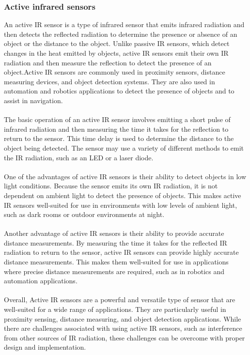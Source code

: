 \documentclass[12pt]{article}
\begin{document}
\subsubsection{Active infrared sensors}
An active IR sensor is a type of infrared sensor that emits infrared radiation and then detects the reflected radiation to determine the presence or absence of an object or the distance to the object. Unlike passive IR sensors, which detect changes in the heat emitted by objects, active IR sensors emit their own IR radiation and then measure the reflection to detect the presence of an object.Active IR sensors are commonly used in proximity sensors, distance measuring devices, and object detection systems. They are also used in automation and robotics applications to detect the presence of objects and to assist in navigation.
\\
\\
The basic operation of an active IR sensor involves emitting a short pulse of infrared radiation and then measuring the time it takes for the reflection to return to the sensor. This time delay is used to determine the distance to the object being detected. The sensor may use a variety of different methods to emit the IR radiation, such as an LED or a laser diode.
\\
\\
One of the advantages of active IR sensors is their ability to detect objects in low light conditions. Because the sensor emits its own IR radiation, it is not dependent on ambient light to detect the presence of objects. This makes active IR sensors well-suited for use in environments with low levels of ambient light, such as dark rooms or outdoor environments at night.
\\
\\
Another advantage of active IR sensors is their ability to provide accurate distance measurements. By measuring the time it takes for the reflected IR radiation to return to the sensor, active IR sensors can provide highly accurate distance measurements. This makes them well-suited for use in applications where precise distance measurements are required, such as in robotics and automation applications.
\\
\\
Overall, Active IR sensors are a powerful and versatile type of sensor that are well-suited for a wide range of applications. They are particularly useful in proximity sensing, distance measuring, and object detection applications. While there are challenges associated with using active IR sensors, such as interference from other sources of IR radiation, these challenges can be overcome with proper design and implementation.
\\
\\
\end{document}
